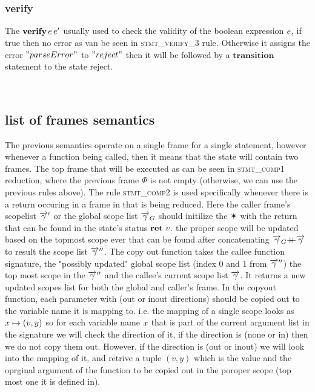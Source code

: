 \documentclass[UTF8]{article}
\begin{document}
\begin{figure}[ht!]
    \ottusedrule{\ottdrulestmtXXtransXXOne{}} \\
    \ottusedrule{\ottdrulestmtXXtransXXTwo{}} \\
    \ottusedrule{\ottdrulestmtXXtransXXThree{}} 
\end{figure}



\subsubsection*{verify}
The $\mathbf{verify} \, e \, e'$ usually used to check the validity of the boolean expression $e$, if true then no error as van be seen in \textsc{stmt\_verify\_3} rule. Otherwise it assigns the error $"parseError"$ to $"reject"$ then it will be followed by a $\mathbf{transition}$ statement to the state reject.
 

\begin{figure}[ht!]
    \ottusedrule{\ottdrulestmtXXverifyXXThree{}} \\
    \ottusedrule{\ottdrulestmtXXverifyXXFour{}} 
\end{figure}



\subsection{list of frames semantics}
The previous semantics operate on a single frame for a single statement, however whenever a function being called, then it means that the state will contain two frames. The top frame that will be executed as can be seen in \textsc{stmt\_comp1} reduction, where the previous frame $\Phi$ is not empty (otherwise, we can use the previous rules above). 
The rule \textsc{stmt\_comp2} is used specifically whenever there is a return occuring in a frame in that is being reduced. Here the caller frame's scopelist $\overrightarrow{\gamma}'$ or the global scope list $\overrightarrow{\gamma}_G$ should initilize the $\varstar$ with the return that can be found in the state's status $\textbf{ret}\,\, v$. the proper scope will be updated based on the topmost scope ever that can be found after concatenating $\overrightarrow{\gamma}_G {+}\mspace{-8mu}{+} \overrightarrow{\gamma}$ to result the scope list $\overrightarrow{\gamma}''$.
The copy out function takes the callee function signature, the "possibly updated" global scope list (index 0 and 1 from $\overrightarrow{\gamma}''$) the top most scope in the $\overrightarrow{\gamma}''$ and the callee's current scope list $\overrightarrow{\gamma}$. It returns a new updated scopes list for both the global and caller's frame. 
In the copyout function, each parameter with (out or inout directions) should be copied out to the variable name it is mapping to. i.e. the mapping of a single scope looks as  $ x \mapsto (v , y) $ so for each variable name $x$ that is part of the current argument list in the signature we will check the direction of it, if the direction is (none or in) then we do not copy them out. However, if the direction is (out or inout) we will look into the mapping of it, and retrive a tuple $(v,y)$ which is the value and the oprginal argument of the function to be copied out in the poroper scope (top most one it is defined in).
\end{document}
